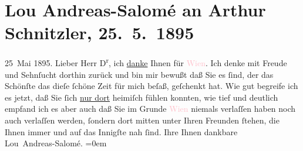 

               \section[Lou Andreas-Salomé an Arthur Schnitzler, 25. 5. 1895]{ Lou Andreas-Salomé an Arthur Schnitzler, 25. 5. 1895}\nopagebreak{}\rehead{ }\normalsize\beginnumbering{} \toendnotes[C]{\smallbreak\pagebreak[2]} 
\pstart
           {\pb}25 Mai 1895.\pend
           \pstart{}Lieber Herr D\textsuperscript{r},\pend\pstart
           ich \uline{danke} Ihnen für \textcolor{pink}{Wien}{}\ledrightnote{\textcolor{pink}{Wien}}. Ich denke mit Freude und Sehnſucht dorthin zurück und bin mir
                    bewußt daß Sie es ſind, der das Schönſte das dieſe ſchöne Zeit für mich beſaß,
                    geſchenkt hat. Wie gut begreife ich es jetzt, daß Sie ſich \uline{nur dort} heimiſch fühlen konnten, wie tief und deutlich empfand
                    ich es aber auch daß Sie im Grunde \textcolor{pink}{Wien}{}\ledrightnote{\textcolor{pink}{Wien}} niemals
                    verlaſſen haben noch auch verlaſſen werden, ſondern dort mitten {\pb}unter Ihren Freunden ſtehen,
                    die Ihnen immer und auf das Innigſte nah ſind.\pend
           \pstart
           Ihre Ihnen dankbare{\\[\baselineskip]}\spacefill\mbox{Lou Andreas-Salomé.}\pend
           \leftskip=0em{}\endnumbering{}  
      